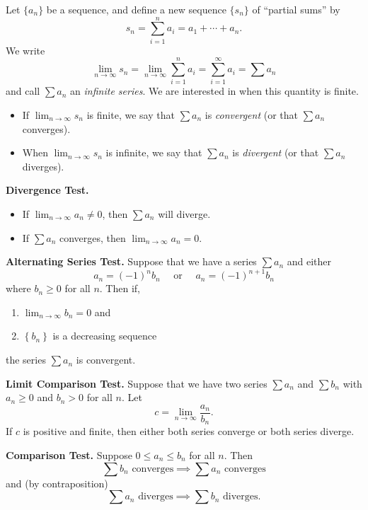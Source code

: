 Let $\{a_n\}$ be a sequence, and define a new sequence $\{s_n\}$ of ``partial sums'' by
$$s_n=\sum_{i=1}^n a_i = a_1 + \cdots + a_n.$$
We write 
$$\lim _{n \to \infty} s_{n}=\lim _{n \to \infty} \sum_{i=1}^{n} a_{i}=\sum_{i=1}^{\infty} a_{i}=\sum a_n$$
and call $\sum a_n$ an \textit{infinite series}. We are interested in when this quantity is finite.
\begin{itemize}
    \item If $\displaystyle\lim _{n \to \infty} s_{n}$ is finite, we say that $\sum a_n$ is \textit{convergent} (or that $\sum a_n$ converges).
    \item  When $\displaystyle\lim _{n \to \infty} s_{n}$ is infinite, we say that $\sum a_n$ is \textit{divergent} (or that $\sum a_n$ diverges).
\end{itemize}

\vspace{.5em}

\begin{multicols}{2}

\begin{tcolorbox}
\textbf{Divergence Test.}
\begin{itemize}
    \item If $\displaystyle \lim_{n\to\infty}a_n\neq 0$, then $\sum a_n$ will diverge.
    \item If $\sum a_n$ converges, then $\displaystyle \lim_{n\to\infty}a_n=0$.
\end{itemize}
\end{tcolorbox}


\begin{tcolorbox}
\textbf{Alternating Series Test.}\newline
Suppose that we have a series $\sum a_{n}$ and either $$a_{n}=(-1)^{n} b_{n}\quad\text{ or }\quad  a_{n}=(-1)^{n+1} b_{n}$$ where $b_{n} \geq 0$ for all $n .$ Then if,
\begin{enumerate}
    \item $\displaystyle\lim _{n \to \infty} b_{n}=0$ and
    \item $\left\{b_{n}\right\}$ is a decreasing sequence
\end{enumerate}
the series $\sum a_{n}$ is convergent.
\end{tcolorbox}

\begin{tcolorbox}
\textbf{Limit Comparison Test.}\newline
Suppose that we have two series $\sum a_n$ and $\sum b_n$ with $a_n\geq 0$ and $b_n > 0$ for all $n$. Let 
$$c=\lim_{n\to\infty}\frac{a_n}{b_n}.$$
If $c$ is positive and finite, then either both series converge or both series diverge.
\end{tcolorbox}


\begin{tcolorbox}
\textbf{Comparison Test.}\newline
Suppose $0\leq a_n\leq b_n$ for all $n$. Then
$$\sum b_n\text{ converges}\implies \sum a_n\text{ converges}$$
and (by contraposition)
$$\sum a_n\text{ diverges}\implies \sum b_n\text{ diverges}.$$
\end{tcolorbox}


\end{multicols}

